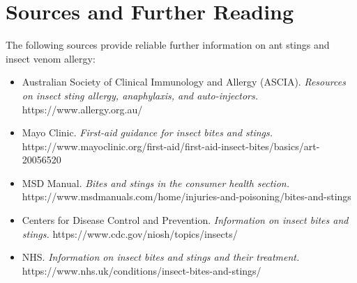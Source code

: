 \section*{Sources and Further Reading}
The following sources provide reliable further information on ant stings and insect venom allergy:

\begin{itemize}
    \item Australian Society of Clinical Immunology and Allergy (ASCIA). \textit{Resources on insect sting allergy, anaphylaxis, and auto-injectors.} https://www.allergy.org.au/
    \item Mayo Clinic. \textit{First-aid guidance for insect bites and stings.} https://www.mayoclinic.org/first-aid/first-aid-insect-bites/basics/art-20056520
    \item MSD Manual. \textit{Bites and stings in the consumer health section.} https://www.msdmanuals.com/home/injuries-and-poisoning/bites-and-stings
    \item Centers for Disease Control and Prevention. \textit{Information on insect bites and stings.} https://www.cdc.gov/niosh/topics/insects/
    \item NHS. \textit{Information on insect bites and stings and their treatment.} https://www.nhs.uk/conditions/insect-bites-and-stings/
\end{itemize}
